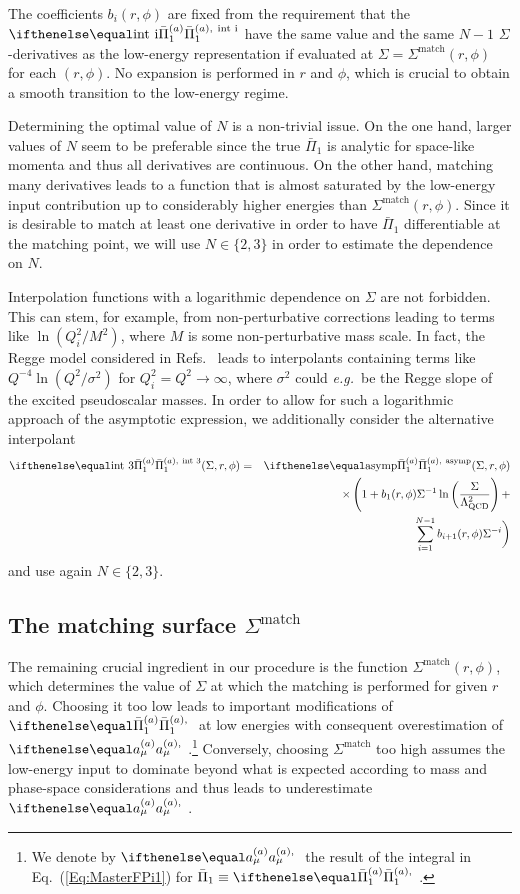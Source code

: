 The coefficients $b_i(r,\phi)$ are fixed from the requirement that the $\PiPS[\text{int i}]$ have the same value and the same $N-1$ $\Sigma$-derivatives as the low-energy representation if evaluated at $\Sigma = \Sigma^\text{match}(r,\phi)$ for each $(r,\phi)$. No expansion is performed in $r$ and $\phi$, which is crucial to obtain a smooth transition to the low-energy regime.

Determining the optimal value of $N$ is a non-trivial issue. On the one hand, larger values of $N$ seem to be preferable since the true $\bar{\Pi}_1$ is analytic for space-like momenta and thus all derivatives are continuous. On the other hand, matching many derivatives leads to a function that is almost saturated by the low-energy input contribution up to considerably higher energies than $\Sigma^\text{match}(r,\phi)$. Since it is desirable to match at least one derivative in order to have $\bar{\Pi}_1$ differentiable at the matching point, we will use $N \in \{2,3\}$ in order to estimate the dependence on $N$.

Interpolation functions with a logarithmic dependence on $\Sigma$ are not forbidden.
This can stem, for example, from non-perturbative corrections leading to terms like $\ln{(Q_i^2/M^2)}$, where $M$ is some non-perturbative mass scale. In fact, the Regge model considered in Refs.~\cite{BernSDCShort,BernSDCLong} leads to interpolants containing terms like $Q^{-4}\ln{(Q^2/\sigma^2)}$ for $Q_i^2 = Q^2 \to \infty$, where $\sigma^2$ could {\it e.g.}\ be the Regge slope of the excited pseudoscalar masses. In order to allow for such a logarithmic approach of the asymptotic expression, we additionally consider the alternative interpolant
\begin{eqnarray}
\PiPS[\text{int 3}](\Sigma, r, \phi) & = & \PiPS[\text{asymp}](\Sigma, r, \phi) \nonumber\\
&&\times\left(1 + b_1(r,\phi) \Sigma^{-1} \ln\bigg(\frac{\Sigma}{\LQCD^2}\right) + \nonumber\\
&&\quad\sum_{i = 1}^{N-1}b_{i+1}(r, \phi) \Sigma^{-i}\bigg)
\label{Eq:interpolant3}
\end{eqnarray}
and use again $N \in \{2,3\}$.


\subsection{The matching surface \texorpdfstring{$\Sigma^\text{match}$}{Sigma match}}
\label{Sec:Sigmamatch}
The remaining crucial ingredient in our procedure is the function $\Sigma^\text{match}(r,\phi)$, which determines the value of $\Sigma$ at which the matching is performed for given $r$ and $\phi$. Choosing it too low leads to important modifications of $\PiPS$ at low energies with consequent overestimation of $\aPS$.\footnote{We denote by $\aPS$ the result of the integral in Eq.~(\ref{Eq:MasterFPi1}) for $\bar{\Pi}_1 \equiv \PiPS$.} Conversely, choosing $\Sigma^\text{match}$ too high assumes the low-energy input to dominate beyond what is expected according to mass and phase-space considerations and thus leads to underestimate $\aPS$.

